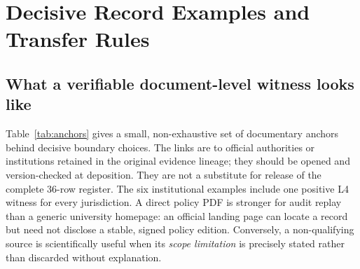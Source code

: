 \section{Decisive Record Examples and Transfer Rules}
\subsection{What a verifiable document-level witness looks like}
Table~\ref{tab:anchors} gives a small, non-exhaustive set of documentary anchors behind decisive boundary choices. The links are to official authorities or institutions retained in the original evidence lineage; they should be opened and version-checked at deposition. They are not a substitute for release of the complete 36-row register. The six institutional examples include one positive L4 witness for every jurisdiction. A direct policy PDF is stronger for audit replay than a generic university homepage: an official landing page can locate a record but need not disclose a stable, signed policy edition. Conversely, a non-qualifying source is scientifically useful when its \emph{scope limitation} is precisely stated rather than discarded without explanation.

